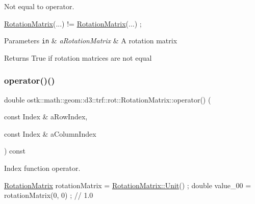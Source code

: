 Not equal to operator. 


\begin{DoxyCode}
\hyperlink{classostk_1_1math_1_1geom_1_1d3_1_1trf_1_1rot_1_1_rotation_matrix_a5e6bed0779ad7db0c5bf26b2bd96f8ba}{RotationMatrix}(...) != \hyperlink{classostk_1_1math_1_1geom_1_1d3_1_1trf_1_1rot_1_1_rotation_matrix_a5e6bed0779ad7db0c5bf26b2bd96f8ba}{RotationMatrix}(...) ;
\end{DoxyCode}



\begin{DoxyParams}[1]{Parameters}
\mbox{\tt in}  & {\em a\+Rotation\+Matrix} & A rotation matrix \\
\hline
\end{DoxyParams}
\begin{DoxyReturn}{Returns}
True if rotation matrices are not equal 
\end{DoxyReturn}
\mbox{\label{classostk_1_1math_1_1geom_1_1d3_1_1trf_1_1rot_1_1_rotation_matrix_a6b34e5000608d95cbd31ff3231fbc907}} 
\subsubsection{\texorpdfstring{operator()()}{operator()()}\hspace{0.1cm}{\footnotesize\ttfamily [1/2]}}
{\footnotesize\ttfamily double ostk\+::math\+::geom\+::d3\+::trf\+::rot\+::\+Rotation\+Matrix\+::operator() (\begin{DoxyParamCaption}\item[{const Index \&}]{a\+Row\+Index,  }\item[{const Index \&}]{a\+Column\+Index }\end{DoxyParamCaption}) const}



Index function operator. 


\begin{DoxyCode}
\hyperlink{classostk_1_1math_1_1geom_1_1d3_1_1trf_1_1rot_1_1_rotation_matrix_a5e6bed0779ad7db0c5bf26b2bd96f8ba}{RotationMatrix} rotationMatrix = \hyperlink{classostk_1_1math_1_1geom_1_1d3_1_1trf_1_1rot_1_1_rotation_matrix_a37c25a2ddaa1dcd24be8dd568259a9b8}{RotationMatrix::Unit}() ;
\textcolor{keywordtype}{double} value\_00 = rotationMatrix(0, 0) ; \textcolor{comment}{// 1.0}
\end{DoxyCode}



